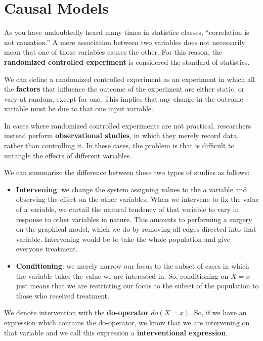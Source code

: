 \chapter{Causal Models}
As you have undoubtedly heard many times in statistics classes, “correlation is
not causation.” A mere association between two variables does not necessarily
mean that one of those variables causes the other. For this reason, the
\textbf{randomized controlled experiment} is considered the standard of statistics.

We can define a randomized controlled experiment as an experiment in which all
the \textbf{factors} that influence the outcome of the experiment are either
static, or vary at random, except for one. This implies that any change in the
outcome variable must be due to that one input variable.

In cases where randomized controlled experiments are not practical, researchers
instead perform \textbf{observational studies}, in which they merely record data,
rather than controlling it. In these cases, the problem is that is difficult to
untangle the effects of different variables.

We can summarize the difference between these two types of studies as follows:
\begin{itemize}
      \item \textbf{Intervening}: we change the system assigning values to the a
            variable and observing the effect on the other variables. When we
            intervene to fix the value of a variable, we curtail the natural
            tendency of that variable to vary in response to other variables in
            nature. This amounts to performing a surgery on the graphical model,
            which we do by removing all edges directed into that variable.
            Intervening would be to take the whole population and give everyone
            treatment.
      \item \textbf{Conditioning}: we merely narrow our focus to the subset of
            cases in which the variable takes the value we are interested in.
            So, conditioning on $X = x$ just means that we are restricting our
            focus to the subset of the population to those who received treatment.
\end{itemize}
We denote intervention with the \textbf{do-operator} $do(X=x)$. So, if we have
an expression which contains the do-operator, we know that we are intervening
on that variable and we call this expression a \textbf{interventional expression}.

